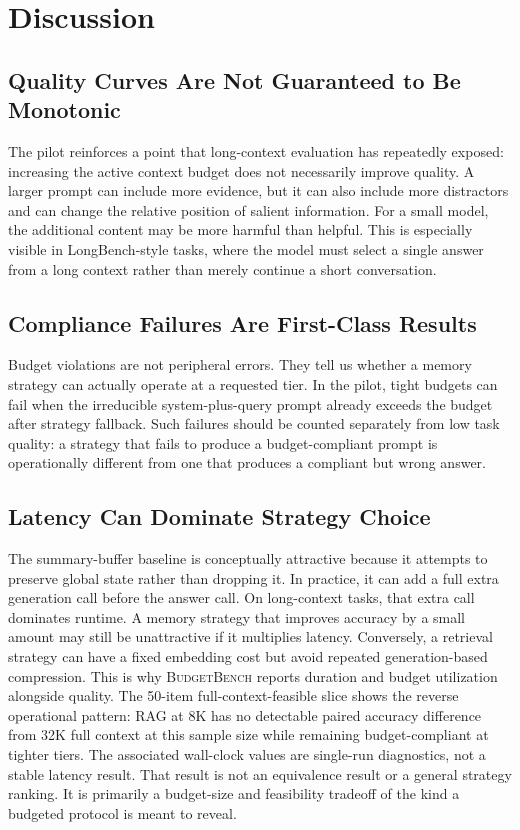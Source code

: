 \documentclass[11pt]{article}
\newcommand{\BudgetBench}{\textsc{BudgetBench}}
\begin{document}
\section{Discussion}

\subsection{Quality Curves Are Not Guaranteed to Be Monotonic}

The pilot reinforces a point that long-context evaluation has repeatedly
exposed: increasing the active context budget does not necessarily improve
quality.  A larger prompt can include more evidence, but it can also include
more distractors and can change the relative position of salient information.
For a small model, the additional content may be more harmful than helpful.
This is especially visible in LongBench-style tasks, where the model must
select a single answer from a long context rather than merely continue a short
conversation.

\subsection{Compliance Failures Are First-Class Results}

Budget violations are not peripheral errors.  They tell us whether a memory
strategy can actually operate at a requested tier.  In the pilot, tight budgets
can fail when the irreducible system-plus-query prompt already exceeds the
budget after strategy fallback.  Such failures should be counted separately
from low task quality: a strategy that fails to produce a budget-compliant
prompt is operationally different from one that produces a compliant but wrong
answer.

\subsection{Latency Can Dominate Strategy Choice}

The summary-buffer baseline is conceptually attractive because it attempts to
preserve global state rather than dropping it.  In practice, it can add a full
extra generation call before the answer call.  On long-context tasks, that
extra call dominates runtime.  A memory strategy that improves accuracy by a
small amount may still be unattractive if it multiplies latency.  Conversely,
a retrieval strategy can have a fixed embedding cost but avoid repeated
generation-based compression.  This is why \BudgetBench{} reports duration and
budget utilization alongside quality.  The 50-item full-context-feasible slice
shows the reverse operational pattern: RAG at 8K has no detectable paired
accuracy difference from 32K full context at this sample size while remaining
budget-compliant at tighter tiers.  The associated wall-clock values are
single-run diagnostics, not a stable latency result.  That result is not an
equivalence result or a general strategy ranking.  It is primarily a
budget-size and feasibility tradeoff of the kind a budgeted protocol is meant
to reveal.
\end{document}
